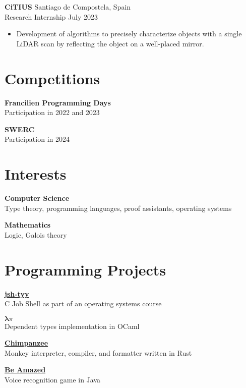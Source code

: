 \documentclass[12pt]{article}
\newcommand{\entry}[4]{{{\textbf{#1}}} \hfill #3 \\ #2 \hfill #4}
\begin{document}
\begin{paracol}{2}
	\entry{CiTIUS}{Research Internship}{Santiago de Compostela, Spain}{July 2023}
	\begin{itemize}[noitemsep,leftmargin=3.5mm,rightmargin=0mm,topsep=6pt]
		\item Development of algorithms to precisely characterize objects with a single LiDAR scan by reflecting the object on a well-placed mirror.
	\end{itemize}


	\switchcolumn

	\section{Competitions}


	\textbf{Francilien Programming Days}\\
	\noindent Participation in 2022 and 2023

	\textbf{SWERC}\\
	\noindent Participation in 2024


\end{paracol}

\section{Interests}


\begin{paracol}{2}

	\entry{Computer Science}{Type theory, programming languages, proof assistants, operating systems}{ }{ }

	\switchcolumn


	\entry{Mathematics}{Logic, Galois theory}{ }{ }
\end{paracol}



\section{Programming Projects}

\begin{paracol}{2}
	\entry{\href{https://github.com/Yag000/jsh-tyy}{jsh-tyy}}{C Job Shell as part of an operating systems course}{ }{ }
	\medskip
	\switchcolumn

	\entry{\href{https://moule.informatique.univ-paris-diderot.fr/iglesias/U3bbU3c0}{$\pmb\lambda\pi$}}{Dependent types implementation in OCaml}{ }{ }
	\medskip
	\switchcolumn

	\entry{\href{https://github.com/Yag000/chimpanzee}{Chimpanzee}}{Monkey interpreter, compiler, and formatter written in Rust}{ }{ }
	\switchcolumn

	\entry{\href{https://github.com/GabinDDL/L2S2-GYTMY-Game}{Be Amazed}}{Voice recognition game in Java}{ }{ }
\end{paracol}
\end{document}
